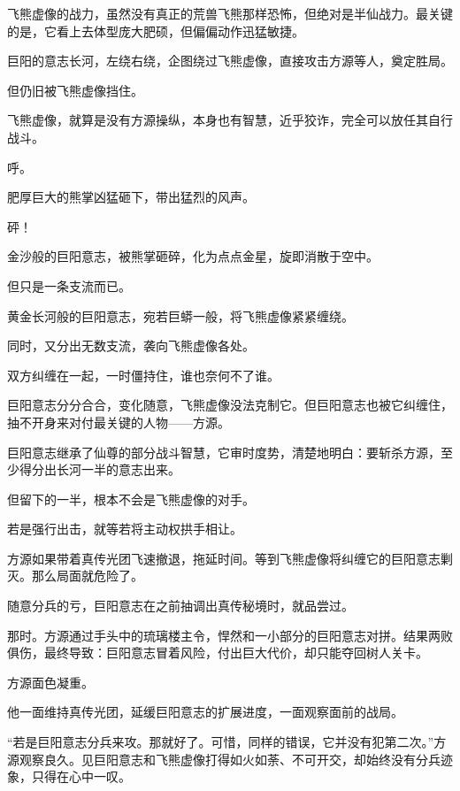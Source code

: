
\begin{this_body}



飞熊虚像的战力，虽然没有真正的荒兽飞熊那样恐怖，但绝对是半仙战力。最关键的是，它看上去体型庞大肥硕，但偏偏动作迅猛敏捷。

巨阳的意志长河，左绕右绕，企图绕过飞熊虚像，直接攻击方源等人，奠定胜局。

但仍旧被飞熊虚像挡住。

飞熊虚像，就算是没有方源操纵，本身也有智慧，近乎狡诈，完全可以放任其自行战斗。

呼。

肥厚巨大的熊掌凶猛砸下，带出猛烈的风声。

砰！

金沙般的巨阳意志，被熊掌砸碎，化为点点金星，旋即消散于空中。

但只是一条支流而已。

黄金长河般的巨阳意志，宛若巨蟒一般，将飞熊虚像紧紧缠绕。

同时，又分出无数支流，袭向飞熊虚像各处。

双方纠缠在一起，一时僵持住，谁也奈何不了谁。

巨阳意志分分合合，变化随意，飞熊虚像没法克制它。但巨阳意志也被它纠缠住，抽不开身来对付最关键的人物——方源。

巨阳意志继承了仙尊的部分战斗智慧，它审时度势，清楚地明白：要斩杀方源，至少得分出长河一半的意志出来。

但留下的一半，根本不会是飞熊虚像的对手。

若是强行出击，就等若将主动权拱手相让。

方源如果带着真传光团飞速撤退，拖延时间。等到飞熊虚像将纠缠它的巨阳意志剿灭。那么局面就危险了。

随意分兵的亏，巨阳意志在之前抽调出真传秘境时，就品尝过。

那时。方源通过手头中的琉璃楼主令，悍然和一小部分的巨阳意志对拼。结果两败俱伤，最终导致：巨阳意志冒着风险，付出巨大代价，却只能夺回树人关卡。

方源面色凝重。

他一面维持真传光团，延缓巨阳意志的扩展进度，一面观察面前的战局。

“若是巨阳意志分兵来攻。那就好了。可惜，同样的错误，它并没有犯第二次。”方源观察良久。见巨阳意志和飞熊虚像打得如火如荼、不可开交，却始终没有分兵迹象，只得在心中一叹。


\end{this_body}

